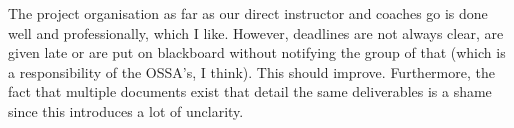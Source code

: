 The project organisation as far as our direct instructor and coaches go is done well and professionally, which I like. However, deadlines are not always clear, are given late or are put on blackboard without notifying the group of that (which is a responsibility of the OSSA's, I think). This should improve. Furthermore, the fact that multiple documents exist that detail the same deliverables is a shame since this introduces a lot of unclarity.